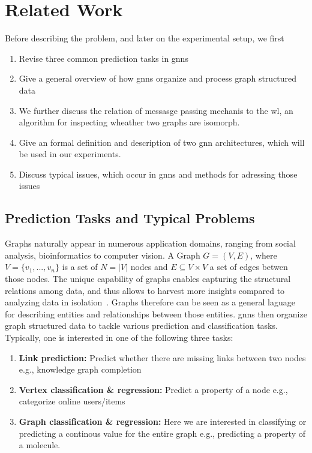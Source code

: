 %
\chapter{Related Work}
\label{sec:related}

Before describing the problem, and later on the experimental setup, we first
\begin{enumerate}
    \item Revise three common prediction tasks in \acp{gnn}
    \item Give a general overview of how \acp{gnn} organize and process graph structured data
    \item We further discuss the relation of messasge passing mechanis to the \ac{wl}, an algorithm for
          inspecting wheather two graphs are isomorph.
    \item Give an formal definition and description of two \ac{gnn}
          architectures, which will be used in our experiments.
    \item Discuss typical issues, which occur in \acp{gnn} and methods for adressing those issues
\end{enumerate}


\section{Prediction Tasks and Typical Problems}
\label{sec:related:pred}

Graphs naturally appear in numerous application domains, ranging from social analysis,
bioinformatics to computer vision.
A Graph $G = (V,E)$, where $V = \{v_{1},...,v_{n}\}$ is a set of $N =|V|$ nodes and
$E \subseteq V\times V$ a set of edges betwen those nodes. The unique capability of
graphs enables capturing the structural relations among data, and thus allows to harvest more
insights compared to analyzing data in isolation~\cite{Zhang19}. Graphs therefore can be
seen as a general laguage for describing entities and relationships between those entities.
\Acfp{gnn} then organize graph structured data to tackle various prediction and classification
tasks. Typically, one is interested in one of the following three tasks:
\begin{enumerate}[label=\textbf{\arabic*.}]
    \item \textbf{Link prediction:}
          Predict whether there are missing links between two nodes
          e.g., knowledge graph completion

    \item \textbf{Vertex classification \& regression:}
          Predict a property of a node e.g., categorize online users/items

    \item \textbf{Graph classification \& regression:}
          Here we are interested in classifying or predicting a continous value for
          the entire graph e.g., predicting a property of a molecule.
\end{enumerate}

